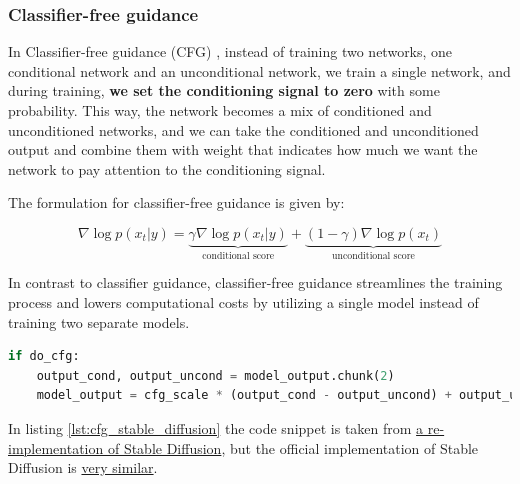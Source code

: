 \subsubsection*{Classifier-free guidance}

In Classifier-free guidance (CFG) \cite{classifier_free_guidance}, instead of training two networks, one conditional network and an unconditional network, we train a single network, and during training, \textbf{we set the conditioning signal to zero} with some probability. This way, the network becomes a mix of conditioned and unconditioned networks, and we can take the conditioned and unconditioned output and combine them with weight that indicates how much we want the network to pay attention to the conditioning signal. 

The formulation for classifier-free guidance is given by:

\[
\nabla \log p(x_t | y) = \underbrace{\gamma \nabla \log p(x_t | y)}_{\text{conditional score}} + \underbrace{(1 - \gamma) \nabla \log p(x_t)}_{\text{unconditional score}}
\]

In contrast to classifier guidance, classifier-free guidance streamlines the training process and lowers computational costs by utilizing a single model instead of training two separate models.

\begin{lstlisting}[language=Python, caption={Classifier-free guidance (CFG) in Stable Diffusion.}, label={lst:cfg_stable_diffusion}]
if do_cfg:
    output_cond, output_uncond = model_output.chunk(2)
    model_output = cfg_scale * (output_cond - output_uncond) + output_uncond
\end{lstlisting}

In listing \ref{lst:cfg_stable_diffusion} the code snippet is taken from \href{https://github.com/hkproj/pytorch-stable-diffusion/blob/e0cb06de011787cdf13eed7b4287ad8410491149/sd/pipeline.py#L135C1-L136C1}{a re-implementation of Stable Diffusion}, but the official implementation of Stable Diffusion is \href{https://github.com/CompVis/stable-diffusion/blob/21f890f9da3cfbeaba8e2ac3c425ee9e998d5229/ldm/models/diffusion/ddim.py#L178C1-L179C1}{very similar}.

















